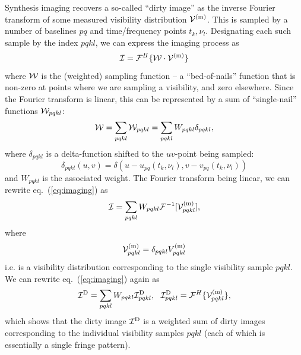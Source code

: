 \documentclass[useAMS,usenatbib]{mn2e}
\begin{document}
Synthesis imaging recovers a so-called ``dirty image'' as the inverse Fourier transform of some measured  
visibility distribution $\mathcal{V}^\mathrm{(m)}$. This is sampled by a number of baselines $pq$ and time/frequency points 
$t_k,\nu_l$. Designating each such sample by the index $pqkl$, we can express the imaging process as
\begin{equation}
\label{eq:imaging}
\mathcal{I} = \mathcal{F}^H\{ \mathcal{W}\cdot \mathcal{V}^\mathrm{(m)} \}  
\end{equation}
where $\mathcal{W}$ is the (weighted) sampling function -- a ``bed-of-nails'' function that is non-zero at points where we 
are sampling a visibility, and zero elsewhere. 
Since the Fourier transform is linear, this can be represented by a sum of  ``single-nail'' functions $\mathcal{W}_{pqkl}$:
\begin{equation}
\mathcal{W} = \sum_{pqkl} \mathcal{W}_{pqkl} = \sum_{pqkl} W_{pqkl} \delta_{pqkl},
\end{equation}
where $\delta_{pqkl}$ is a delta-function shifted to the $uv$-point being sampled:
\begin{equation}
\delta_{pqkl}(u,v) = \delta(u-u_{pq}(t_k,\nu_l),v-v_{pq}(t_k,\nu_l))
\end{equation}
and $W_{pqkl}$ is the 
associated weight. The Fourier transform being linear, we can rewrite eq.~(\ref{eq:imaging}) as 
\begin{equation}
\label{eq:imaging2}
\mathcal{I} = \sum_{pqkl} W_{pqkl} \mathcal{F}^{-1}[ \mathcal{V}^\mathrm{(m)}_{pqkl} ],
\end{equation}
where 
\begin{equation}
\label{eq:imaging2a}
\mathcal{V}^\mathrm{(m)}_{pqkl} = \delta_{pqkl} V^\mathrm{(m)}_{pqkl}
\end{equation}
i.e. is a visibility distribution corresponding to the single visibility sample $pqkl$. We can rewrite eq.~(\ref{eq:imaging})
again as
\begin{equation}
\label{eq:imaging3}
\mathcal{I}^\mathrm{D} =  \sum_{pqkl} W_{pqkl} \mathcal{I}^\mathrm{D}_{pqkl},~~
\mathcal{I}^\mathrm{D}_{pqkl} =  \mathcal{F}^H\{ \mathcal{V}^\mathrm{(m)}_{pqkl} \},
\end{equation}
which shows that the dirty image $\mathcal{I}^\mathrm{D}$ is a weighted sum of dirty images corresponding to the individual visibility 
samples $pqkl$ (each of which is essentially a single fringe pattern).
\end{document}
